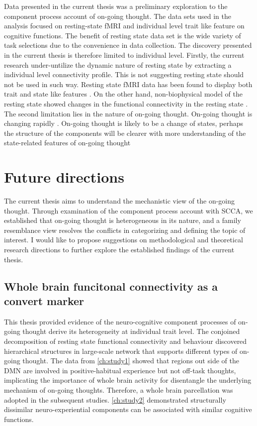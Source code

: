 Data presented in the current thesis was a preliminary exploration to the component process account of on-going thought. The data sets used in the analysis focused on resting-state fMRI and individual level trait like feature on cognitive functions. The benefit of resting state data set is the wide variety of task selections due to the convenience in data collection. The discovery presented in the current thesis is therefore limited to individual level. Firstly, the current research under-untilize the dynamic nature of resting state by extracting a individual level connectivity profile. This is not suggesting resting state should not be used in such way. Resting state fMRI data has been found to display both trait and state like features \cite{Geerligs2015}. On the other hand, non-biophysical model of the resting state showed changes in the functional connectivity in the resting state \cite{Vidaurre2017}. The second limitation lies in the nature of on-going thought. On-going thought is changing rapidly \cite{KucyiNI2017}. On-going thought is likely to be a change of states, perhaps the structure of the components will be clearer with more understanding of the state-related features of on-going thought


\section{Future directions}
\label{ch:discussion:future}
The current thesis aims to understand the mechanistic view of the on-going thought. Through examination of the component process account with SCCA, we established that on-going thought is heterogeneous in its nature, and a family resemblance view resolves the conflicts in categorizing and defining the topic of interest. I would like to propose suggestions on methodological and theoretical research directions to further explore the established findings of the current thesis.

\subsection{Whole brain funcitonal connectivity as a convert marker}
This thesis provided evidence of the neuro-cognitive component processes of on-going thought derive its heterogeneity at individual trait level. The conjoined decomposition of resting state functional connectivity and behaviour discovered hierarchical structures in large-scale network  that supports different types of on-going thought. The data from \cref{ch:study1} showed that regions out side of the DMN are involved in positive-habitual experience but not off-task thoughts, implicating the importance of whole brain activity for disentangle the underlying mechanism of on-going thoughts. Therefore, a whole brain parcellation was adopted in the subsequent studies. \cref{ch:study2} demonstrated structurally dissimilar neuro-experiential components can be associated with similar cognitive functions. 

